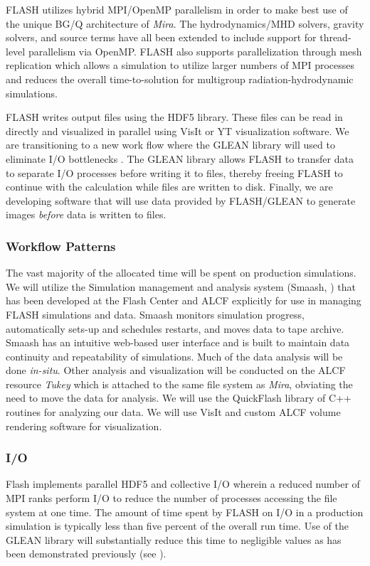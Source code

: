 FLASH utilizes hybrid MPI/OpenMP parallelism in order to make best use
of the unique BG/Q architecture of {\it Mira}. The hydrodynamics/MHD
solvers, gravity solvers, and source terms have all been extended to
include support for thread-level parallelism via OpenMP. FLASH also
supports parallelization through mesh replication which allows a
simulation to utilize larger numbers of MPI processes and reduces the
overall time-to-solution for multigroup radiation-hydrodynamic
simulations.


FLASH writes output files using the HDF5 library. These files can be
read in directly and visualized in parallel using VisIt or YT
visualization software. We are transitioning to a new work flow where
the GLEAN library will used to eliminate I/O bottlenecks
\cite{vishwanath2011}. The GLEAN library allows FLASH to transfer data
to separate I/O processes before writing it to files, thereby freeing
FLASH to continue with the calculation while files are written to
disk. Finally, we are developing software that will use data provided
by FLASH/GLEAN to generate images \textsl{before} data is written to
files.


\subsubsection{Workflow Patterns}

The vast majority of the allocated time will be spent on production
simulations. We will utilize the Simulation management and analysis
system (Smaash, \citep{Hudson:2011tp}) that has been developed at the
Flash Center and ALCF explicitly for use in managing FLASH simulations
and data. Smaash monitors simulation progress, automatically sets-up
and schedules restarts, and moves data to tape archive. Smaash has an
intuitive web-based user interface and is built to maintain data
continuity and repeatability of simulations. Much of the data analysis
will be done {\it in-situ}.  Other analysis and visualization will be
conducted on the ALCF resource {\it Tukey} which is attached to the
same file system as {\it Mira}, obviating the need to move the data for
analysis.  We will use the QuickFlash library of C++ routines for
analyzing our data.  We will use VisIt and custom ALCF volume
rendering software for visualization.

\subsubsection{I/O}
Flash implements parallel HDF5 and collective I/O wherein a reduced
number of MPI ranks perform I/O to reduce the number of processes
accessing the file system at one time. The amount of time spent by
FLASH on I/O in a production simulation is typically less than five
percent of the overall run time. Use of the GLEAN library will
substantially reduce this time to negligible values as has been
demonstrated previously (see \citet{vishwanath2011}).

